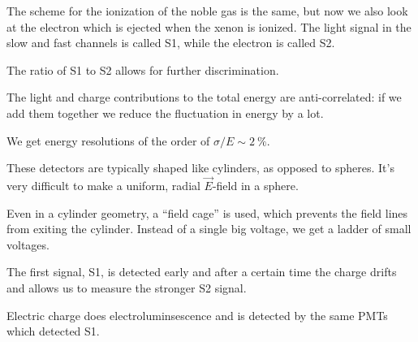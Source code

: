 \documentclass[main.tex]{subfiles}
\begin{document}
The scheme for the ionization of the noble gas is the same, but now we also look at the
electron which is ejected when the xenon is ionized. 
The light signal in the slow and fast channels is called S1, while the electron is called S2. 

The ratio of S1 to S2 allows for further discrimination. 

The light and charge contributions to the total energy are anti-correlated: 
if we add them together we reduce the fluctuation in energy by a lot.

We get energy resolutions of the order of \(\sigma / E \sim \SI{2}{\percent}\). 

These detectors are typically shaped like cylinders, as opposed to spheres. 
It's very difficult to make a uniform, radial \(\vec{E}\)-field in a sphere. 

Even in a cylinder geometry, a ``field cage'' is used, which prevents the field lines from exiting the cylinder. 
Instead of a single big voltage, we get a ladder of small voltages. 

The first signal, S1, is detected early and after a certain time the charge drifts and 
allows us to measure the stronger S2 signal. 

Electric charge does electroluminsescence and is detected by the same PMTs which detected S1. 
\end{document}
